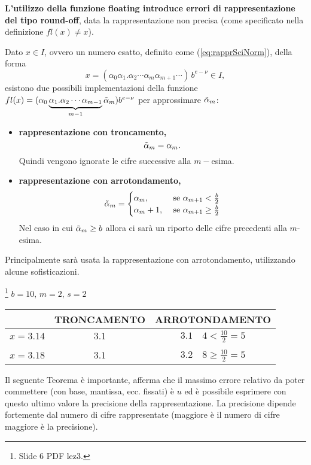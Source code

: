 \textbf{L'utilizzo della funzione floating introduce errori di rappresentazione del tipo round-off}, data la rappresentazione non precisa (come specificato nella definizione $fl(x)\neq x$).

Dato $x\in I$, ovvero un numero esatto, definito come (\ref{eq:rapprSciNorm}), della forma 
\begin{equation}\label{eq:numEsatto}
	x=(\alpha_0\alpha_1.\alpha_2\cdots\alpha_m\alpha_{m+1}\cdots)\,b^{e-\nu}\in I,
\end{equation}
esistono due possibili implementazioni della funzione $fl(x)=(\alpha_0\underbrace{\alpha_1.\alpha_2\cdots\alpha_{m-1}}_{m-1}\Tilde{\alpha}_m)b^{e-\nu}$ per approssimare $\Tilde{\alpha}_m$:
\begin{itemize}
	\item \textbf{rappresentazione con troncamento,} \begin{equation}\label{eq:troncamento}
		\Tilde{\alpha}_m=\alpha_m.
	\end{equation}
	Quindi vengono ignorate le cifre successive alla $m-$esima.
	\item \textbf{rappresentazione con arrotondamento,}
	\begin{align}
		\Tilde{\alpha}_m=
		\begin{cases}
			\alpha_m, &\text{ se }\alpha_{m+1}<\frac{b}{2}\\
			\alpha_m+1, &\text{ se }\alpha_{m+1}\geq\frac{b}{2}
		\end{cases}
	\end{align}
	Nel caso in cui $\Tilde{\alpha}_m\geq b$ allora ci sarà un riporto delle cifre precedenti alla $m$-esima.
\end{itemize}
Principalmente sarà usata la rappresentazione con arrotondamento, utilizzando alcune sofisticazioni.

\begin{example}\footnote{Slide 6 PDF lez3.}
	$b=10,\, m=2,\, s=2$
	\begin{center}
		\begin{tabular}{c|cc}
			& TRONCAMENTO & ARROTONDAMENTO\\
			\hline
			$x=3.14$ & $3.1$ & $3.1\quad 4<\frac{10}{2}=5$\\\\
			$x=3.18$ & $3.1$ & $3.2 \quad 8 \geq \frac{10}{2}=5$
		\end{tabular}
	\end{center}
\end{example}

Il seguente Teorema è importante, afferma che il massimo errore relativo da poter commettere (con base, mantissa, ecc. fissati) è $u$ ed è possibile esprimere con questo ultimo valore la precisione della rappresentazione. La precisione dipende fortemente dal numero di cifre rappresentate (maggiore è il numero di cifre maggiore è la precisione).

